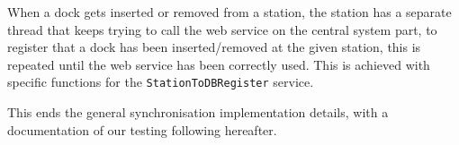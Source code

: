 \begin{description}[style=nextline]
	\item[Dock insertion/removal]
	When a dock gets inserted or removed from a station, the station has a separate thread that keeps trying to call the web service on the central system part, to register that a dock has been inserted/removed at the given station, this is repeated until the web service has been correctly used.
	This is achieved with specific functions for the \texttt{StationToDBRegister} service.
	
\end{description}

This ends the general synchronisation implementation details, with a documentation of our testing following hereafter.